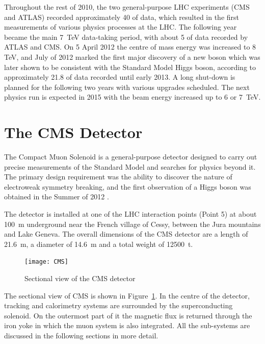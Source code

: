 Throughout the rest of 2010, the two general-purpose LHC experiments (CMS and ATLAS) recorded approximately
\SI{40}{\invpb} of data, which resulted in the first measurements of various physics processes at the LHC. The following
year became the main \SI{7}{\TeV} data-taking period, with about \SI{5}{\invfb} of data recorded by ATLAS and CMS. On 5
April 2012 the centre of mass energy was increased to 8 TeV, and July of 2012 marked the first major discovery of a new
boson which was later shown to be consistent with the Standard Model Higgs boson, according to approximately
\SI{21.8}{\invfb} of data recorded until early 2013. A long shut-down is planned for the following two years with
various upgrades scheduled. The next physics run is expected in 2015 with the beam energy increased up to 6 or
\SI{7}{\TeV}.

\section{The CMS Detector}
\label{s:CMS}

The Compact Muon Solenoid \autocite{CMS} is a general-purpose detector designed to carry out precise measurements of the
Standard Model and searches for physics beyond it. The primary design requirement was the ability to discover the nature
of electroweak symmetry breaking, and the first observation of a Higgs boson was obtained in the Summer of 2012
\autocite{CMS_higgs_observation}.

The detector is installed at one of the LHC interaction points (Point 5) at about \SI{100}{\metre} underground near the
French village of Cessy, between the Jura mountains and Lake Geneva. The overall dimensions of the CMS detector are a
length of \SI{21.6}{\metre}, a diameter of \SI{14.6}{\metre} and a total weight of \SI{12500}{\tonne}.

\begin{figure}[htbp]
  \centering
  \leavevmode
  \texttt{[image: CMS]}
  \caption{Sectional view of the CMS detector}
  \label{fig:CMS}
\end{figure}

The sectional view of CMS is shown in Figure~\ref{fig:CMS}. In the centre of the detector, tracking and calorimetry
systems are surrounded by the superconducting solenoid. On the outermost part of it the magnetic flux is returned
through the iron yoke in which the muon system is also integrated. All the sub-systems are discussed in the following
sections in more detail.

